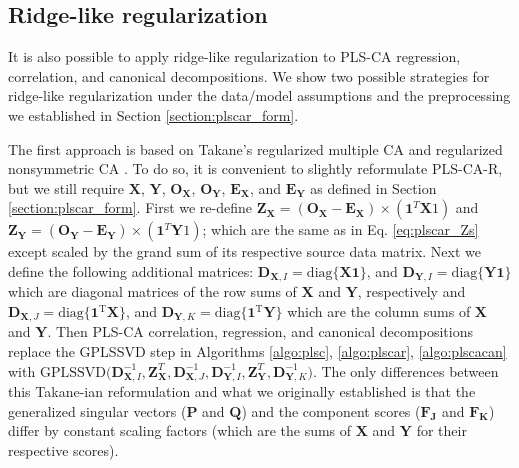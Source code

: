 \documentclass[12pt]{article}
\begin{document}
\hypertarget{ridge-like-regularization}{%
\subsection{Ridge-like regularization}\label{ridge-like-regularization}}

It is also possible to apply ridge-like regularization to PLS-CA
regression, correlation, and canonical decompositions. We show two
possible strategies for ridge-like regularization under the data/model
assumptions and the preprocessing we established in Section
\ref{section:plscar_form}.

The first approach is based on Takane's regularized multiple CA
\citep{takane_regularized_2006} and regularized nonsymmetric CA
\citep{takane_regularized_2009-1}. To do so, it is convenient to
slightly reformulate PLS-CA-R, but we still require \({\mathbf X}\),
\({\mathbf Y}\), \({\mathbf O}_{\mathbf X}\),
\({\mathbf O}_{\mathbf Y}\), \({\mathbf E}_{\mathbf X}\), and
\({\mathbf E}_{\mathbf Y}\) as defined in Section
\ref{section:plscar_form}. First we re-define
\({\mathbf Z}_{\mathbf X} = ({\mathbf O}_{\mathbf X} - {\mathbf E}_{\mathbf X}) \times (\mathbf{1}^{T}{\mathbf X1})\)
and
\({\mathbf Z}_{\mathbf Y} = ({\mathbf O}_{\mathbf Y} - {\mathbf E}_{\mathbf Y}) \times (\mathbf{1}^{T}{\mathbf Y1})\);
which are the same as in Eq. \ref{eq:plscar_Zs} except scaled by the
grand sum of its respective source data matrix. Next we define the
following additional matrices:
\({\mathbf D}_{{\mathbf X},I} = \mathrm{diag\{ \mathbf{X1} \}}\), and
\({\mathbf D}_{{\mathbf Y},I} = \mathrm{diag\{ \mathbf{Y1} \}}\) which
are diagonal matrices of the row sums of \({\mathbf X}\) and
\({\mathbf Y}\), respectively and
\({\mathbf D}_{{\mathbf X},J} = \mathrm{diag\{ \mathbf{1}^{T} \mathbf{X} \}}\),
and
\({\mathbf D}_{{\mathbf Y},K} = \mathrm{diag\{ \mathbf{1}^{T}\mathbf{Y} \}}\)
which are the column sums of \({\mathbf X}\) and \({\mathbf Y}\). Then
PLS-CA correlation, regression, and canonical decompositions replace the
GPLSSVD step in Algorithms \ref{algo:plsc}, \ref{algo:plscar},
\ref{algo:plscacan} with
\(\mathrm{GPLSSVD(}{\mathbf D}_{{\mathbf X},I}^{-1},{\mathbf Z}_{\mathbf X}^{T}, {\mathbf D}_{{\mathbf X},J}^{-1}, {\mathbf D}_{{\mathbf Y},I}^{-1},{\mathbf Z}_{\mathbf Y}^{T}, {\mathbf D}_{{\mathbf Y},K}^{-1} \mathrm{)}\).
The only differences between this Takane-ian reformulation and what we
originally established is that the generalized singular vectors
(\({\mathbf P}\) and \({\mathbf Q}\)) and the component scores
(\({\mathbf F}_{\mathbf J}\) and \({\mathbf F}_{\mathbf K}\)) differ by
constant scaling factors (which are the sums of \({\mathbf X}\) and
\({\mathbf Y}\) for their respective scores).
\end{document}
